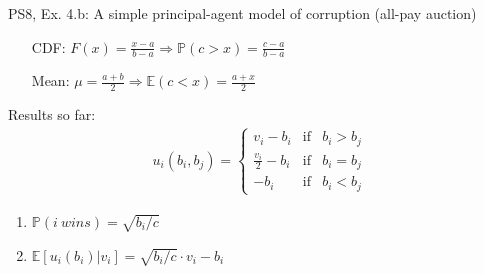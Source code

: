 \begin{frame}{PS8, Ex. 4.b: A simple principal-agent model of corruption (all-pay auction)}
\begin{multicols}{2}
\begin{itemize}
        \item[CDF:] $F(x)=\frac{x-a}{b-a}\Rightarrow\mathbb{P}(c>x)=\frac{c-a}{b-a}$
        \item[Mean:] $\mu=\frac{a+b}{2}\Rightarrow\mathbb{E}(c<x)=\frac{a+x}{2}$
      \end{itemize}
      \vspace{-6pt}
      Results so far: \vspace{-6pt}
      \begin{align*}
        u_i(b_i,b_j)=\left\{\begin{array}{lcl}
          v_i-b_i           & \text{if} & b_i>b_j \\
          \frac{v_i}{2}-b_i & \text{if} & b_i=b_j \\
          -b_i              & \text{if} & b_i<b_j
        \end{array}\right.
      \end{align*} \vspace{-16pt}
      \begin{enumerate}
        \item $\mathbb{P}(i\ wins)=\sqrt{b_i/c}$
        \item $\mathbb{E}[u_i(b_i)|v_i]=\sqrt{b_i/c}\cdot v_i-b_i$
      \end{enumerate}
      \vfill\null
    \end{multicols}
\end{frame}
